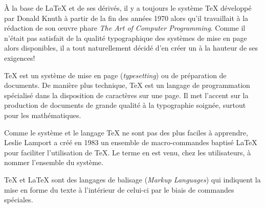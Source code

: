 À la base de {\LaTeX} et de ses dérivés, il y a toujours le système
{\TeX} développé par Donald Knuth à partir de la fin des années 1970
alors qu'il travaillait à la rédaction de son {\oe}uvre phare
\emph{The Art of Computer Programming}. Comme il n'était pas satisfait
de la qualité typographique des systèmes de mise en page alors
disponibles, il a tout naturellement décidé d'en créer un à la hauteur
de ses exigences!

{\TeX} est un système de mise en page (\emph{typesetting}) ou de
préparation de documents. De manière plus technique, {\TeX} est un
langage de programmation spécialisé dans la disposition de caractères
sur une page. Il met l'accent sur la production de documents de grande
qualité à la typographie soignée, surtout pour les mathématiques.

Comme le système et le langage {\TeX} ne sont pas des plus faciles à
apprendre, Leslie Lamport a créé en 1983 un ensemble de
macro-commandes baptisé {\LaTeX} pour faciliter l'utilisation de
{\TeX}. Le terme en est venu, chez les utilisateurs, à nommer
l'ensemble du système.

{\TeX} et {\LaTeX} sont des langages de balisage (\emph{Markup
  Languages}) qui indiquent la mise en forme du texte à l'intérieur de
celui-ci par le biais de commandes spéciales.

